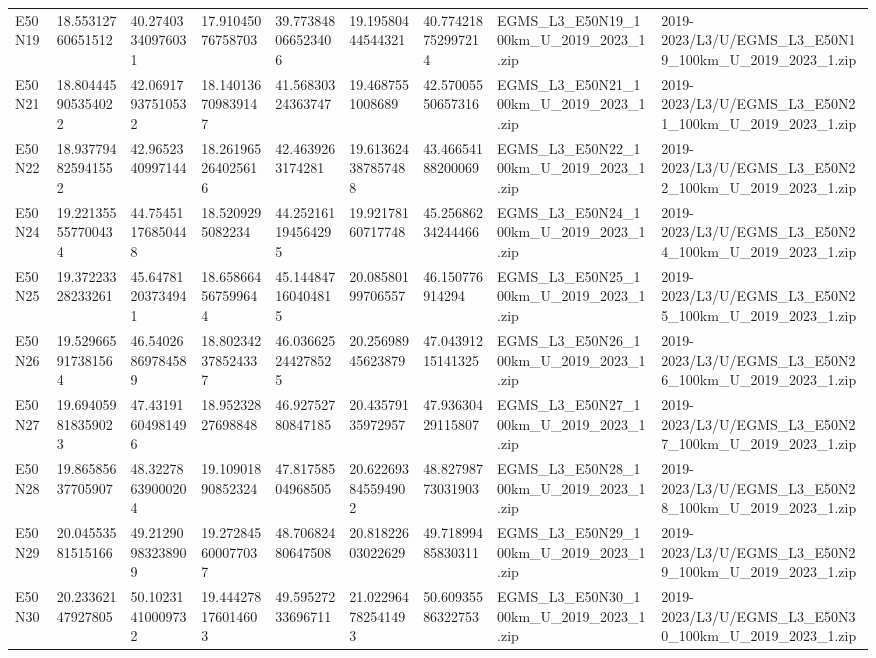 \begin{landscape}
\begin{longtable}{lllllllll}
E50N19 & 18.55312760651512 & 40.27403340976031 & 17.91045076758703 & 39.773848066523406 & 19.19580444544321 & 40.774218752997214 & EGMS\_L3\_E50N19\_100km\_U\_2019\_2023\_1.zip & 2019-2023/L3/U/EGMS\_L3\_E50N19\_100km\_U\_2019\_2023\_1.zip \\
E50N21 & 18.804445905354022 & 42.06917937510532 & 18.140136709839147 & 41.56830324363747 & 19.4687551008689 & 42.57005550657316 & EGMS\_L3\_E50N21\_100km\_U\_2019\_2023\_1.zip & 2019-2023/L3/U/EGMS\_L3\_E50N21\_100km\_U\_2019\_2023\_1.zip \\
E50N22 & 18.937794825941552 & 42.9652340997144 & 18.261965264025616 & 42.4639263174281 & 19.613624387857488 & 43.46654188200069 & EGMS\_L3\_E50N22\_100km\_U\_2019\_2023\_1.zip & 2019-2023/L3/U/EGMS\_L3\_E50N22\_100km\_U\_2019\_2023\_1.zip \\
E50N24 & 19.221355557700434 & 44.75451176850448 & 18.5209295082234 & 44.252161194564295 & 19.92178160717748 & 45.25686234244466 & EGMS\_L3\_E50N24\_100km\_U\_2019\_2023\_1.zip & 2019-2023/L3/U/EGMS\_L3\_E50N24\_100km\_U\_2019\_2023\_1.zip \\
E50N25 & 19.37223328233261 & 45.64781203734941 & 18.658664567599644 & 45.144847160404815 & 20.08580199706557 & 46.150776914294 & EGMS\_L3\_E50N25\_100km\_U\_2019\_2023\_1.zip & 2019-2023/L3/U/EGMS\_L3\_E50N25\_100km\_U\_2019\_2023\_1.zip \\
E50N26 & 19.529665917381564 & 46.54026869784589 & 18.802342378524337 & 46.036625244278525 & 20.25698945623879 & 47.04391215141325 & EGMS\_L3\_E50N26\_100km\_U\_2019\_2023\_1.zip & 2019-2023/L3/U/EGMS\_L3\_E50N26\_100km\_U\_2019\_2023\_1.zip \\
E50N27 & 19.694059818359023 & 47.43191604981496 & 18.95232827698848 & 46.92752780847185 & 20.43579135972957 & 47.93630429115807 & EGMS\_L3\_E50N27\_100km\_U\_2019\_2023\_1.zip & 2019-2023/L3/U/EGMS\_L3\_E50N27\_100km\_U\_2019\_2023\_1.zip \\
E50N28 & 19.86585637705907 & 48.32278639000204 & 19.10901890852324 & 47.81758504968505 & 20.622693845594902 & 48.82798773031903 & EGMS\_L3\_E50N28\_100km\_U\_2019\_2023\_1.zip & 2019-2023/L3/U/EGMS\_L3\_E50N28\_100km\_U\_2019\_2023\_1.zip \\
E50N29 & 20.04553581515166 & 49.21290983238909 & 19.272845600077037 & 48.70682480647508 & 20.81822603022629 & 49.71899485830311 & EGMS\_L3\_E50N29\_100km\_U\_2019\_2023\_1.zip & 2019-2023/L3/U/EGMS\_L3\_E50N29\_100km\_U\_2019\_2023\_1.zip \\
E50N30 & 20.23362147927805 & 50.10231410009732 & 19.444278176014603 & 49.59527233696711 & 21.022964782541493 & 50.60935586322753 & EGMS\_L3\_E50N30\_100km\_U\_2019\_2023\_1.zip & 2019-2023/L3/U/EGMS\_L3\_E50N30\_100km\_U\_2019\_2023\_1.zip \\

\end{longtable}
\end{landscape}
